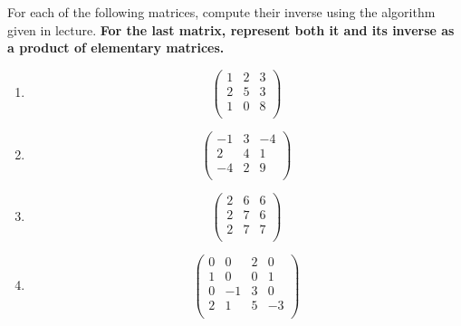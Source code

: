 \documentclass[12pt]{article} %
\begin{document}
For each of the following matrices, compute their inverse using the algorithm given in lecture. \textbf{For the last matrix, represent
both it and its inverse as a product of elementary matrices.}
\begin{enumerate}
\item \[\left(\begin{array}{rrr}
1&2&3\\
2&5&3\\
1&0&8\\
\end{array}\right)
\]

\item \[\left(\begin{array}{rrr}
-1&3&-4\\
2&4&1\\
-4&2&9\\
\end{array}\right)
\]

\item \[\left(\begin{array}{rrr}
2&6&6\\
2&7&6\\
2&7&7\\
\end{array}\right)
\]

\item \[\left(\begin{array}{rrrr}
0&0&2&0\\
1&0&0&1\\
0&-1&3&0\\
2&1&5&-3\\
\end{array}\right)
\]
\end{enumerate}
\end{document}
